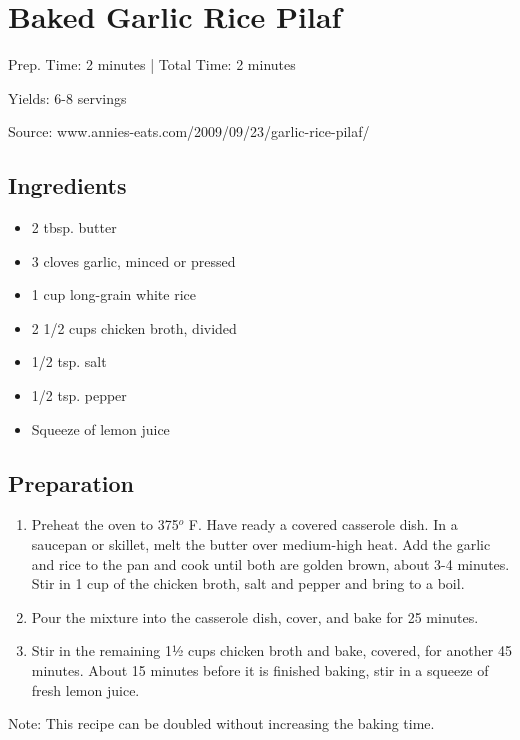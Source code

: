 \section{Baked Garlic Rice Pilaf}

\begin{center}
Prep. Time: 2 minutes |
Total Time: 2 minutes

Yields: 6-8 servings

\vspace{1em}

Source: www.annies-eats.com/2009/09/23/garlic-rice-pilaf/
\end{center}

\subsection{Ingredients}
\begin{multicols}{2}
\begin{itemize}
    \item 2 tbsp. butter
    \item 3 cloves garlic, minced or pressed
    \item 1 cup long-grain white rice
    \item 2 1/2 cups chicken broth, divided
    \item 1/2 tsp. salt
    \item 1/2 tsp. pepper
    \item Squeeze of lemon juice
\end{itemize}
\end{multicols}

\subsection{Preparation}
\begin{enumerate}
    \item Preheat the oven to 375$^o$ F.  Have ready a covered casserole dish.  In a saucepan or skillet, melt the butter over medium-high heat.  Add the garlic and rice to the pan and cook until both are golden brown, about 3-4 minutes.  Stir in 1 cup of the chicken broth, salt and pepper and bring to a boil.
    \item Pour the mixture into the casserole dish, cover, and bake for 25 minutes.
    \item Stir in the remaining 1½ cups chicken broth and bake, covered, for another 45 minutes.  About 15 minutes before it is finished baking, stir in a squeeze of fresh lemon juice.

\end{enumerate}

Note: This recipe can be doubled without increasing the baking time.
